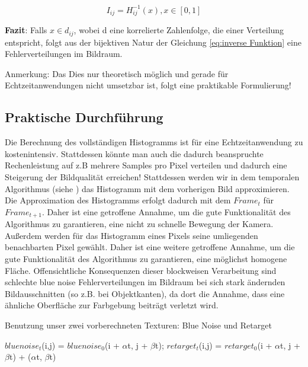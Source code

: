 \begin{equation}\label{eq:inverse Funktion}
    I_{ij} = H_{ij}^{-1}(x), x \in [0,1]
\end{equation}

\par

\textbf{Fazit}: Falls $x \in d_{ij}$, wobei d eine korrelierte Zahlenfolge, die einer 
 Verteilung entspricht, folgt aus der bijektiven
Natur der Gleichung \ref{eq:inverse Funktion} eine  
Fehlerverteilungen im Bildraum. 

Anmerkung: Das Dies nur theoretisch möglich und gerade für Echtzeitanwendungen nicht umsetzbar ist, 
folgt eine praktikable Formulierung!

\subsection{Praktische Durchführung}

Die Berechnung des vollständigen Histogramms ist für eine Echtzeitanwendung
zu kostenintensiv. Stattdessen könnte man auch die dadurch beanspruchte 
Rechenleistung auf z.B mehrere Samples pro Pixel verteilen und dadurch eine 
Steigerung der Bildqualität erreichen!
Stattdessen werden wir in dem temporalen Algorithmus (siehe \cite{hal02158423})
das Histogramm mit dem vorherigen Bild approximieren. 
Die Approximation des Histogramms erfolgt dadurch mit dem $Frame_{t}$ 
für $Frame_{t+1}$. Daher ist eine getroffene Annahme, um die gute Funktionalität des 
Algorithmus zu garantieren, eine nicht zu schnelle Bewegung der Kamera.
Außerdem werden für das Histogramm eines Pixels seine umliegenden benachbarten Pixel gewählt.
Daher ist eine weitere getroffene Annahme, um die gute Funktionalität des 
Algorithmus zu garantieren, eine möglichst homogene Fläche. 
Offensichtliche Konsequenzen dieser blockweisen Verarbeitung sind schlechte blue noise 
Fehlerverteilungen im Bildraum bei sich stark ändernden Bildausschnitten
(so z.B. bei Objektkanten), da dort die Annahme, dass eine ähnliche Oberfläche
zur Farbgebung beiträgt verletzt wird.

\begin{algorithm}[H]
    \caption{Benutzung unser zwei vorberechneten Texturen: Blue Noise und Retarget}
    \begin{algorithmic}[1]
        \State $bluenoise_{t}$(i,j) = $bluenoise_{0}$(i + $\alpha$t, j + $\beta$t); 
        \State $retarget_{t}$(i,j) = $retarget_{0}$(i + $\alpha$t, j + $\beta$t) + ($\alpha$t, $\beta$t)
    \end{algorithmic}
    \label{alg:Benutzung vorberechneter Texturen}
\end{algorithm}

